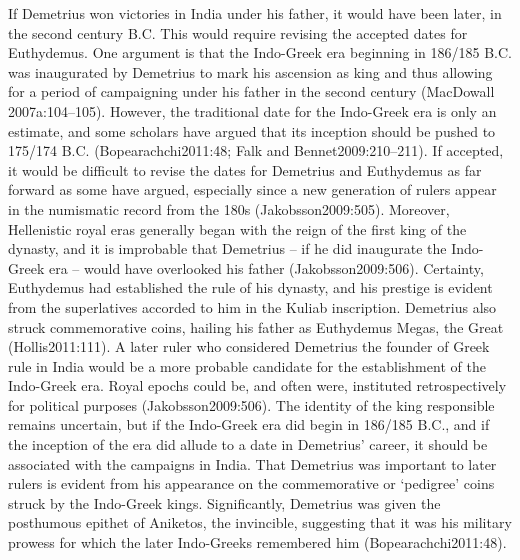 \documentclass{ijsra}
\begin{document}
If Demetrius won victories in India under his father, it would have been later, in the second century B.C.
This would require revising the accepted dates for Euthydemus.
One argument is that the Indo-Greek era beginning in 186/185 B.C. was inaugurated by Demetrius to mark his ascension as king
and thus allowing for a period of campaigning under his father in the second century (MacDowall 2007a:104–105).
However, the traditional date for the Indo-Greek era is only an estimate, and some scholars have argued that its inception
should be pushed to 175/174 B.C. 
(Bopearachchi2011:48; Falk and Bennet2009:210–211).
If accepted, it would be difficult to revise the dates for Demetrius and Euthydemus as far forward as some have argued,
especially since a new generation of rulers appear in the numismatic record from the 180s (Jakobsson2009:505).
Moreover, Hellenistic royal eras generally began with the reign of the first king of the dynasty,
and it is improbable that Demetrius – if he did inaugurate the Indo-Greek era – would have overlooked his father (Jakobsson2009:506).
Certainty, Euthydemus had established the rule of his dynasty, and his prestige is evident from the superlatives accorded to him
in the Kuliab inscription.
Demetrius also struck commemorative coins, hailing his father as Euthydemus Megas, the Great (Hollis2011:111).
A later ruler who considered Demetrius the founder of Greek rule in India would be a more probable candidate for the establishment
of the Indo-Greek era.
Royal epochs could be, and often were, instituted retrospectively for political purposes (Jakobsson2009:506).
The identity of the king responsible remains uncertain, but if the Indo-Greek era did begin in 186/185 B.C., and if the inception
of the era did allude to a date in Demetrius’ career, it should be associated with the campaigns in India.
That Demetrius was important to later rulers is evident from his appearance on the commemorative or ‘pedigree’ coins struck by
the Indo-Greek kings.
Significantly, Demetrius was given the posthumous epithet of Aniketos, the invincible,
suggesting that it was his military prowess for which the later Indo-Greeks remembered him (Bopearachchi2011:48).
\end{document}
